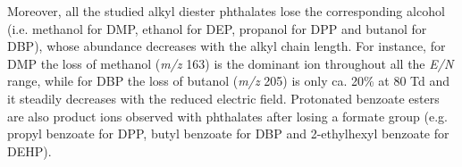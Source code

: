 Moreover,  all the studied alkyl diester phthalates lose  the corresponding alcohol (i.e. methanol for DMP, ethanol for DEP, propanol for DPP and butanol for DBP), whose abundance   decreases with  the alkyl chain length. 
%
For instance, for DMP the loss of methanol (\textit{m/z} 163) is the dominant ion throughout all the \textit{E/N} range, while for DBP the loss of butanol (\textit{m/z} 205) is only ca. 20\% at 80 Td and it steadily decreases with the reduced electric field. 
%
Protonated benzoate esters are also product ions observed with phthalates after losing a formate group (e.g. propyl benzoate for DPP, butyl benzoate for DBP and 2-ethylhexyl benzoate for DEHP).








